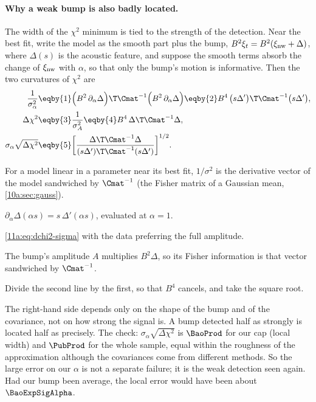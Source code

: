 \paragraph{Why a weak bump is also badly located.} The width of the $\chi^2$ minimum
is tied to the strength of the detection. Near the best fit, write the model as the
smooth part plus the bump, $B^2\xi_t=B^2(\xi_{\rm nw}+\Delta)$, where $\Delta(s)$ is
the acoustic feature, and suppose the smooth terms absorb the change of $\xi_{\rm nw}$
with $\alpha$, so that only the bump's motion is informative. Then the two curvatures
of $\chi^2$ are
\begin{align}
  \frac{1}{\sigma_\alpha^2}
  &\eqby{1}\Bigl(B^2\,\partial_\alpha\Delta\Bigr)\T\Cmat^{-1}\Bigl(B^2\,\partial_\alpha\Delta\Bigr)
   \eqby{2}B^4\,\bigl(s\Delta'\bigr)\T\Cmat^{-1}\bigl(s\Delta'\bigr),
  \nonumber\\
  \Delta\chi^2
  &\eqby{3}\frac{1}{\sigma_A^2}
   \eqby{4}B^4\,\Delta\T\Cmat^{-1}\Delta ,
  \nonumber\\
  \sigma_\alpha\sqrt{\Delta\chi^2}
  &\eqby{5}\biggl[\frac{\Delta\T\Cmat^{-1}\Delta}{(s\Delta')\T\Cmat^{-1}(s\Delta')}\biggr]^{1/2}.
  \label{13c:eq:sigma-dchi}
\end{align}
\begin{explain}
  \item For a model linear in a parameter near its best fit, $1/\sigma^2$ is the
        derivative vector of the model sandwiched by $\Cmat^{-1}$ (the Fisher matrix
        of a Gaussian mean, \cref{10a:sec:gauss}).
  \item $\partial_\alpha\Delta(\alpha s)=s\,\Delta'(\alpha s)$, evaluated at $\alpha=1$.
  \item \eqref{11a:eq:dchi2-sigma} with the data preferring the full amplitude.
  \item The bump's amplitude $A$ multiplies $B^2\Delta$, so its Fisher information is
        that vector sandwiched by $\Cmat^{-1}$.
  \item Divide the second line by the first, so that $B^4$ cancels, and take the square root.
\end{explain}
The right-hand side depends only on the shape of the bump and of the covariance, not
on how strong the signal is. A bump detected half as strongly is located half as
precisely. The check: $\sigma_\alpha\sqrt{\Delta\chi^2}$ is $\BaoProd$ for our cap
(local width) and $\PubProd$ for the whole sample, equal within the roughness of the
approximation although the covariances come from different methods. So the large
error on our $\alpha$ is not a separate failure; it is the weak detection seen again.
Had our bump been average, the local error would have been about
$\BaoExpSigAlpha$.

